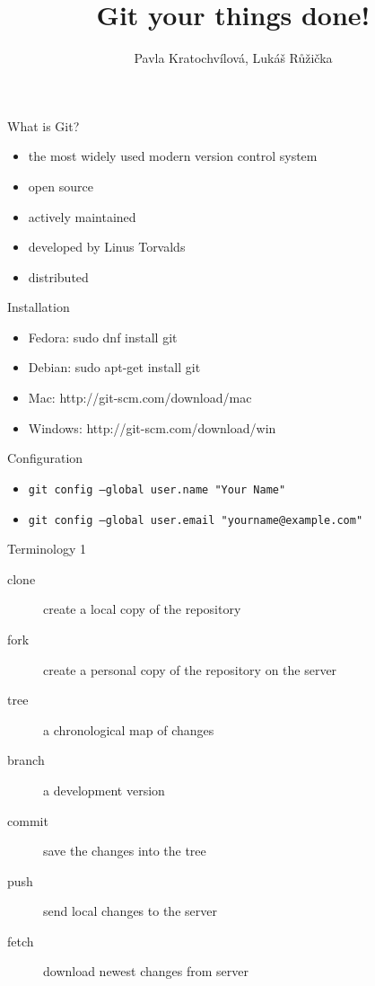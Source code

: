 \documentclass[14pt]{beamer}
\begin{document}
	\author{Pavla Kratochvílová, Lukáš Růžička}
	\title{Git your things done!}
	\begin{frame}[plain]
		\maketitle
	\end{frame}
	
	\begin{frame}{What is Git?}
		\begin{itemize}
		\item the most widely used modern version control system
		\item open source
		\item actively maintained
		\item developed by Linus Torvalds
		\item distributed 
		\end{itemize}
	\end{frame}

	\begin{frame}{Installation}
		\begin{itemize}
		\item Fedora: sudo dnf install git
		\item Debian: sudo apt-get install git
		\item Mac: http://git-scm.com/download/mac
		\item Windows: http://git-scm.com/download/win
		\end{itemize}
	\end{frame}

	\begin{frame}{Configuration}
		\begin{itemize}
		\item \texttt{git config --global user.name "Your Name"}
		\item \texttt{git config --global user.email "yourname@example.com"}
		\end{itemize}
	\end{frame}

	\begin{frame}{Terminology 1}
	\begin{description}
		\item[clone] create a local copy of the repository
		\item[fork] create a personal copy of the repository on the server 
		\item[tree] a chronological map of changes
		\item[branch] a development version
		\item[commit] save the changes into the tree
		\item[push] send local changes to the server
		\item[fetch] download newest changes from server
	\end{description}
	\end{frame}
\end{document}
